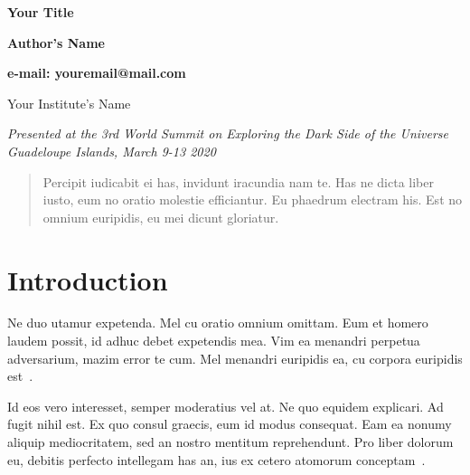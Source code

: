 \documentclass[letterpaper]{article}
\begin{document}
\vspace*{1.2cm}



\thispagestyle{empty}
\begin{center}

{\LARGE \bf Your Title}


\par\vspace*{7mm}\par

{

\bigskip

\large \bf Author's Name}


\bigskip


{\large \bf  e-mail: youremail@mail.com}

\bigskip

{ Your Institute's Name}

\bigskip

{\it Presented at the 3rd World Summit on Exploring the Dark Side of the Universe \\Guadeloupe Islands, March 9-13 2020}

\end{center}





\begin{abstract}
Percipit iudicabit ei has, invidunt iracundia nam te. Has ne dicta liber iusto, eum no oratio molestie efficiantur. Eu phaedrum electram his. Est no omnium euripidis, eu mei dicunt gloriatur.
\end{abstract}
  
\section{Introduction}
\label{S:intro}

Ne duo utamur expetenda. Mel cu oratio omnium omittam. Eum et homero laudem possit, id adhuc debet expetendis mea. Vim ea menandri perpetua adversarium, mazim error te cum. Mel menandri euripidis ea, cu corpora euripidis est~\cite{Aad:2012tfa}.

Id eos vero interesset, semper moderatius vel at. Ne quo equidem explicari. Ad fugit nihil est. Ex quo consul graecis, eum id modus consequat. Eam ea nonumy aliquip mediocritatem, sed an nostro mentitum reprehendunt. Pro liber dolorum eu, debitis perfecto intellegam has an, ius ex cetero atomorum conceptam~\cite{Chatrchyan:2012xdj}.
\end{document}

